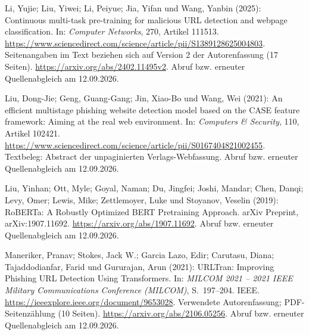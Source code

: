 \par\smallskip
\begin{samepage}
\noindent
Li, Yujie; Liu, Yiwei; Li, Peiyue; Jia, Yifan und Wang, Yanbin (2025):
Continuous multi-task pre-training for malicious URL detection and webpage classification.
In: \textit{Computer Networks}, 270, Artikel 111513.
\url{https://www.sciencedirect.com/science/article/pii/S1389128625004803}.
Seitenangaben im Text beziehen sich auf Version 2 der Autorenfassung (17 Seiten). \url{https://arxiv.org/abs/2402.11495v2}.
Abruf bzw. erneuter Quellenabgleich am 12.09.2026.
\par\end{samepage}
\par\smallskip
\begin{samepage}
\noindent
Liu, Dong-Jie; Geng, Guang-Gang; Jin, Xiao-Bo und Wang, Wei (2021):
An efficient multistage phishing website detection model based on the CASE feature framework:
Aiming at the real web environment.
In: \textit{Computers \& Security}, 110, Artikel 102421.
\url{https://www.sciencedirect.com/science/article/pii/S0167404821002455}.
Textbeleg: Abstract der unpaginierten Verlags-Webfassung.
Abruf bzw. erneuter Quellenabgleich am 12.09.2026.
\par\end{samepage}
\par\smallskip
\begin{samepage}
\noindent
Liu, Yinhan; Ott, Myle; Goyal, Naman; Du, Jingfei; Joshi, Mandar;
Chen, Danqi; Levy, Omer; Lewis, Mike; Zettlemoyer, Luke und Stoyanov, Veselin (2019):
RoBERTa: A Robustly Optimized BERT Pretraining Approach.
arXiv Preprint, arXiv:1907.11692.
\url{https://arxiv.org/abs/1907.11692}.
Abruf bzw. erneuter Quellenabgleich am 12.09.2026.
\par\end{samepage}
\par\smallskip
\begin{samepage}
\noindent
Maneriker, Pranav; Stokes, Jack W.; Garcia Lazo, Edir; Carutasu, Diana;
Tajaddodianfar, Farid und Gururajan, Arun (2021):
URLTran: Improving Phishing URL Detection Using Transformers.
In: \textit{MILCOM 2021 -- 2021 IEEE Military Communications Conference (MILCOM)},
S.~197--204.
IEEE.
\url{https://ieeexplore.ieee.org/document/9653028}.
Verwendete Autorenfassung; PDF-Seitenzählung (10 Seiten). \url{https://arxiv.org/abs/2106.05256}.
Abruf bzw. erneuter Quellenabgleich am 12.09.2026.
\par\end{samepage}

